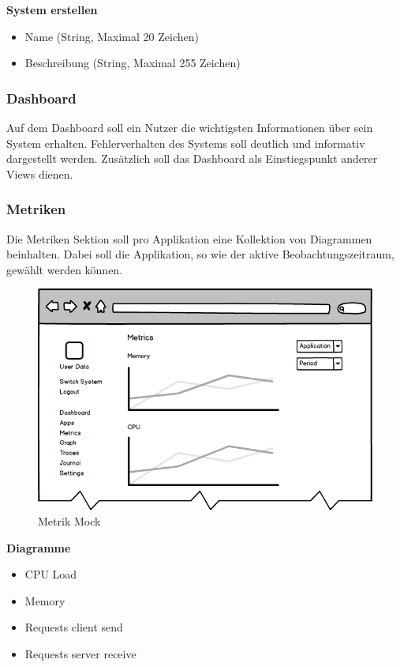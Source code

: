 \textbf{System erstellen}

\begin{itemize}
\item Name (String, Maximal 20 Zeichen)
\item Beschreibung (String, Maximal 255 Zeichen)
\end{itemize}


\subsubsection{Dashboard}

Auf dem Dashboard soll ein Nutzer die wichtigsten Informationen über sein System erhalten.
Fehlerverhalten des Systems soll deutlich und informativ dargestellt werden.
Zusätzlich soll das Dashboard als Einstiegspunkt anderer Views dienen.

\subsubsection{Metriken}

Die Metriken Sektion soll pro Applikation eine Kollektion von Diagrammen beinhalten.
Dabei soll die Applikation, so wie der aktive Beobachtungszeitraum, gewählt werden können.

\begin{figure}[h]
 \centering
 \includegraphics[width=0.6\linewidth]{kapitel1/mocks/metrics.png}
 \caption{Metrik Mock}
  \label{fig:metrics}
\end{figure}

\textbf{Diagramme}

\begin{itemize}
\item CPU Load
\item Memory
\item Requests client send
\item Requests server receive
\end{itemize}


